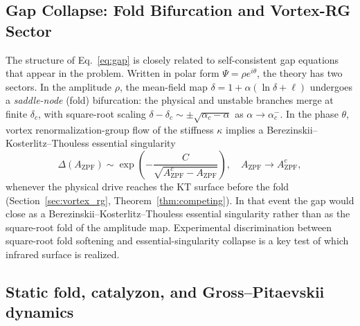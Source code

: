 \documentclass[11pt,letterpaper]{article}
\begin{document}
\subsection{Gap Collapse: Fold Bifurcation and Vortex-RG Sector}


The structure of Eq.~\eqref{eq:gap} is closely related to self-consistent gap equations that appear in the \BKT{} problem\cite{Berezinskii1971,Kosterlitz1973}. Written in polar form $\Psi=\rho e^{i\theta}$, the theory has two sectors. In the amplitude $\rho$, the mean-field map $\delta=1+\alpha(\ln\delta+\ell)$ undergoes a \emph{saddle-node} (fold) bifurcation: the physical and unstable branches merge at finite $\delta_c$, with square-root scaling $\delta-\delta_c\sim\pm\sqrt{\alpha_c-\alpha}$ as $\alpha\to\alpha_c^-$. In the phase $\theta$, vortex renormalization-group flow of the stiffness $\kappa$ implies a Berezinskii--Kosterlitz--Thouless essential singularity
\begin{equation}
\Delta(A_{\text{ZPF}}) \sim \exp\left( -\frac{C}{\sqrt{A_{\text{ZPF}}^c - A_{\text{ZPF}}}} \right), \quad A_{\text{ZPF}} \to A_{\text{ZPF}}^c,
\end{equation}
whenever the physical drive reaches the KT surface before the fold (Section~\ref{sec:vortex_rg}, Theorem~\ref{thm:competing}). In that event the gap would close as a Berezinskii--Kosterlitz--Thouless essential singularity rather than as the square-root fold of the amplitude map. Experimental discrimination between square-root fold softening and essential-singularity collapse is a key test of which infrared surface is realized.

\subsection{Static fold, catalyzon, and Gross--Pitaevskii dynamics}
\end{document}
